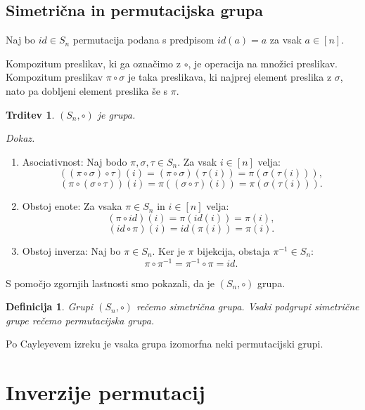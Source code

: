 \documentclass[a4paper, 12pt]{book}
\newtheorem{definicija}{Definicija}[chapter]
\newtheorem{trditev}{Trditev}[chapter]
\newenvironment{dokaz}{\emph{Dokaz.}\ }{\hspace{\fill}{$\Box$}}
\begin{document}
\subsection{ Simetrična in permutacijska grupa }

Naj bo $id \in S_n$ permutacija podana s predpisom $id(a) = a$ za vsak $a \in [n]$.

Kompozitum preslikav, ki ga označimo z $\circ$, je operacija na množici preslikav. Kompozitum preslikav $\pi \circ \sigma$ je taka preslikava, ki najprej element preslika z $\sigma$, nato pa dobljeni element preslika še s $\pi$.

\begin{trditev}
    $(S_n, \circ)$ je grupa.
\end{trditev}
\begin{dokaz}
    \begin{enumerate}
        \item Asociativnost: Naj bodo $\pi, \sigma, \tau \in S_n$. Za vsak $i \in [n]$ velja: 
        \[
            ((\pi \circ \sigma) \circ \tau)(i) = (\pi \circ \sigma)(\tau(i)) = \pi(\sigma(\tau(i))),
        \]
        \[
            (\pi \circ (\sigma \circ \tau))(i) = \pi((\sigma \circ \tau)(i)) = \pi(\sigma(\tau(i))).
        \]
        \item Obstoj enote: Za vsaka $\pi \in S_n$ in $i \in [n]$ velja:
        \[
            (\pi \circ id)(i) = \pi(id(i)) = \pi(i),
        \]
        \[
            (id \circ \pi)(i) = id(\pi(i)) = \pi(i).
        \]
        \item Obstoj inverza: Naj bo $\pi \in S_n$. Ker je $\pi$ bijekcija, obstaja $\pi^{-1} \in S_n$:
        \[
            \pi \circ \pi^{-1} = \pi^{-1} \circ \pi = id.
        \]
    \end{enumerate}
    S pomočjo zgornjih lastnosti smo pokazali, da je $(S_n, \circ)$ grupa.
\end{dokaz}

\begin{definicija}
    Grupi $(S_n, \circ)$ rečemo simetrična grupa. Vsaki podgrupi simetrične grupe rečemo permutacijska grupa.
\end{definicija}
Po Cayleyevem izreku \cite{dsSkripta} je vsaka grupa izomorfna neki permutacijski grupi.


\section{ Inverzije permutacij }
\end{document}
